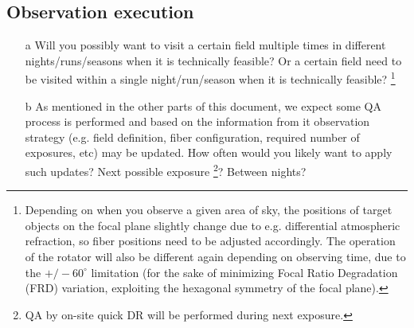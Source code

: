 \documentclass[a4paper,notitlepage]{article}
\newcommand{\colm}[1]{\textcolor{ccolm}{#1}}
\newcommand{\coll}[1]{\textcolor{ccoll}{#1}}
\begin{document}
%
%

\subsection{Observation execution}

\begin{enumerate}
  \item[\coll{a}] Will you possibly want to visit a certain field
           multiple times in different nights/runs/seasons when it
           is technically feasible?
           Or a certain field need to be visited within a single 
           night/run/season when it is technically feasible? 
           \footnote{Depending on when you
           observe a given area of sky, the positions of target
           objects on the focal plane slightly change due to
           e.g. differential atmospheric refraction, so fiber
           positions need to be adjusted accordingly. The operation
           of the rotator will also be different again depending on
           observing time, due to the $+/-60^{\circ}$ limitation
           (for the sake of minimizing Focal Ratio Degradation (FRD)
           variation, exploiting the hexagonal symmetry of the focal
           plane).}
  \item[\coll{b}] As mentioned in the other parts of this document, we
           expect some QA process is performed and based on the
           information from it observation strategy (e.g. field
           definition, fiber configuration, required number of
           exposures, etc) may be updated. How often would you
           likely want to apply such updates? Next possible exposure
           \footnote{QA by on-site quick DR will be performed during next 
           exposure.}?
           Between nights?
\end{enumerate}
\end{document}
